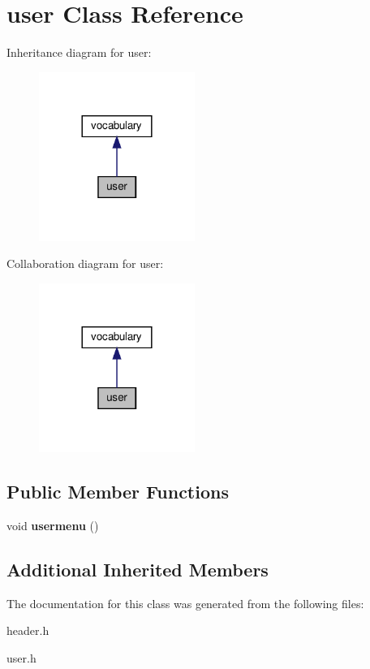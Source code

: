 \hypertarget{classuser}{}\section{user Class Reference}
\label{classuser}


Inheritance diagram for user\+:\nopagebreak
\begin{figure}[H]
\begin{center}
\leavevmode
\includegraphics[width=144pt]{classuser__inherit__graph}
\end{center}
\end{figure}


Collaboration diagram for user\+:\nopagebreak
\begin{figure}[H]
\begin{center}
\leavevmode
\includegraphics[width=144pt]{classuser__coll__graph}
\end{center}
\end{figure}
\subsection*{Public Member Functions}
\begin{DoxyCompactItemize}
\item 
\mbox{\label{classuser_a18767ad955443aa3cd2f60256e973a76}} 
void {\bfseries usermenu} ()
\end{DoxyCompactItemize}
\subsection*{Additional Inherited Members}


The documentation for this class was generated from the following files\+:\begin{DoxyCompactItemize}
\item 
header.\+h\item 
user.\+h\end{DoxyCompactItemize}
